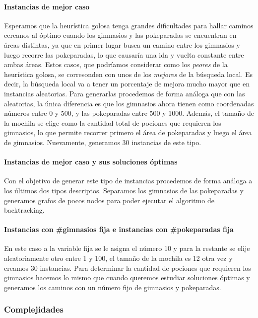 \paragraph{Instancias de mejor caso}
Esperamos que la heur\'istica golosa tenga grandes dificultades para hallar caminos cercanos al \'optimo cuando los gimnasios y las pokeparadas se encuentran en \'areas distintas, ya que en primer lugar busca un camino entre los gimnasios y luego recorre las pokeparadas, lo que causar\'ia una ida y vuelta constante entre ambas \'areas. Estos casos, que podr\'iamos considerar como los \textit{peores} de la heur\'istica golosa, se corresonden con unos de los \textit{mejores} de la b\'usqueda local. Es decir, la b\'usqueda local va a tener un porcentaje de mejora mucho mayor que en instancias aleatorias. Para generarlas procedemos de forma an\'aloga que con las aleatorias, la \'unica diferencia es que los gimnasios ahora tienen como coordenadas n\'umeros entre 0 y 500, y las pokeparadas entre 500 y 1000. Adem\'as, el tamaño de la mochila se elige como la cantidad total de pociones que requieren los gimnasios, lo que permite recorrer primero el \'area de pokeparadas y luego el \'area de gimnasios. Nuevamente, generamos 30 instancias de este tipo.

\paragraph{Instancias de mejor caso y sus soluciones \'optimas}
Con el objetivo de generar este tipo de instancias procedemos de forma an\'aloga a los \'ultimos dos tipos descriptos. Separamos los gimnasios de las pokeparadas y generamos grafos de pocos nodos para poder ejecutar el algoritmo de backtracking.

\paragraph{Instancias con \#gimnasios fija e instancias con \#pokeparadas fija}
En este caso a la variable fija se le asigna el n\'umero 10 y para la restante se elije aleatoriamente otro entre 1 y 100, el tamaño de la mochila es 12 otra vez y creamos 30 instancias. Para determinar la cantidad de pociones que requieren los gimnasios hacemos lo mismo que cuando queremos estudiar soluciones \'optimas y generamos los caminos con un n\'umero fijo de gimnasios y pokeparadas.

\subsubsection{Complejidades}

